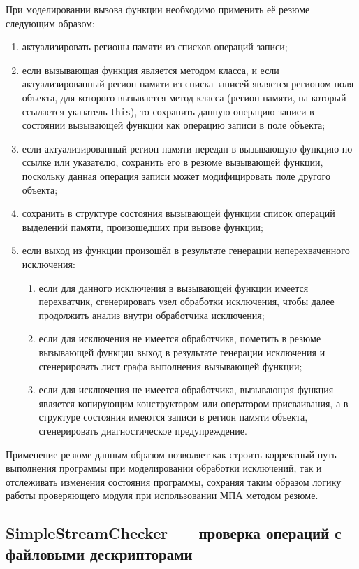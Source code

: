 При моделировании вызова функции необходимо применить её резюме следующим образом:

\begin{enumerate}
 \item актуализировать регионы памяти из списков операций записи;
 \item если вызывающая функция является методом класса, и если актуализированный регион памяти из списка записей является регионом поля объекта, для которого вызывается метод класса (регион памяти, на который ссылается указатель \texttt{this}), то сохранить данную операцию записи в состоянии вызывающей функции как операцию записи в поле объекта;
 \item если актуализированный регион памяти передан в вызывающую функцию по ссылке или указателю, сохранить его в резюме вызывающей функции, поскольку данная операция записи может модифицировать поле другого объекта;
 \item сохранить в структуре состояния вызывающей функции список операций выделений памяти, произошедших при вызове функции;
 \item если выход из функции произошёл в результате генерации неперехваченного исключения:
 \begin{enumerate}
  \item если для данного исключения в вызывающей функции имеется перехватчик, сгенерировать узел обработки исключения, чтобы далее продолжить анализ внутри обработчика исключения;
  \item если для исключения не имеется обработчика, пометить в резюме вызывающей функции выход в результате генерации исключения и сгенерировать лист графа выполнения вызывающей функции;
  \item если для исключения не имеется обработчика, вызывающая функция является копирующим конструктором или оператором присваивания, а в структуре состояния имеются записи в регион памяти объекта, сгенерировать диагностическое предупреждение.
 \end{enumerate}
\end{enumerate}

Применение резюме данным образом позволяет как строить корректный путь выполнения программы при моделировании обработки исключений, так и отслеживать изменения состояния программы, сохраняя таким образом логику работы проверяющего модуля при использовании МПА методом резюме.

\subsection{SimpleStreamChecker~--- проверка операций с файловыми дескрипторами}

